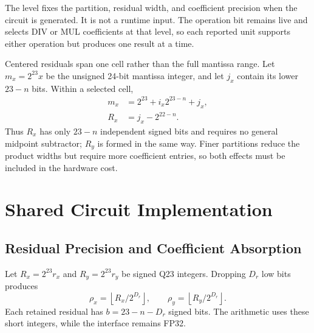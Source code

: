\documentclass[conference]{IEEEtran}
\begin{document}
The level fixes the partition, residual width, and coefficient precision when
the circuit is generated. It is not a runtime input. The operation bit remains
live and selects DIV or MUL coefficients at that level, so each reported unit
supports either operation but produces one result at a time.

Centered residuals span one cell rather than the full mantissa range. Let
$m_x=2^{23}x$ be the unsigned 24-bit mantissa integer, and let $j_x$ contain
its lower $23-n$ bits. Within a selected cell,
\begin{equation}
\begin{aligned}
m_x&=2^{23}+i_x2^{23-n}+j_x,\\
R_x&=j_x-2^{22-n}.
\end{aligned}
\label{eq:localinteger}
\end{equation}
Thus $R_x$ has only $23-n$ independent signed bits and requires no general
midpoint subtractor; $R_y$ is formed in the same way. Finer partitions reduce
the product widths but require more coefficient entries, so both effects must
be included in the hardware cost.

\section{Shared Circuit Implementation}
\subsection{Residual Precision and Coefficient Absorption}
Let $R_x=2^{23}r_x$ and $R_y=2^{23}r_y$ be signed Q23 integers.
Dropping $D_r$ low bits produces
\begin{equation}
\rho_x=\left\lfloor R_x/2^{D_r}\right\rfloor,\qquad
\rho_y=\left\lfloor R_y/2^{D_r}\right\rfloor.
\label{eq:rho}
\end{equation}
Each retained residual has $b=23-n-D_r$ signed bits. The arithmetic uses
these short integers, while the interface remains FP32.
\end{document}
